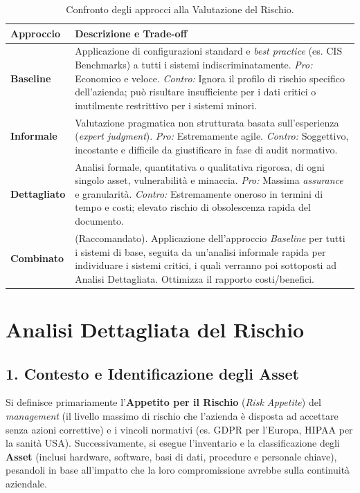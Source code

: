 \begin{table}[htbp]
\centering
\small
\begin{tabularx}{\textwidth}{@{}lX@{}}
\toprule
\textbf{Approccio} & \textbf{Descrizione e Trade-off} \\ \midrule
\textbf{Baseline} & Applicazione di configurazioni standard e \textit{best practice} (es. CIS Benchmarks) a tutti i sistemi indiscriminatamente. \textit{Pro:} Economico e veloce. \textit{Contro:} Ignora il profilo di rischio specifico dell'azienda; può risultare insufficiente per i dati critici o inutilmente restrittivo per i sistemi minori. \\ \addlinespace
\textbf{Informale} & Valutazione pragmatica non strutturata basata sull'esperienza (\textit{expert judgment}). \textit{Pro:} Estremamente agile. \textit{Contro:} Soggettivo, incostante e difficile da giustificare in fase di audit normativo. \\ \addlinespace
\textbf{Dettagliato} & Analisi formale, quantitativa o qualitativa rigorosa, di ogni singolo asset, vulnerabilità e minaccia. \textit{Pro:} Massima \textit{assurance} e granularità. \textit{Contro:} Estremamente oneroso in termini di tempo e costi; elevato rischio di obsolescenza rapida del documento. \\ \addlinespace
\textbf{Combinato} & (Raccomandato). Applicazione dell'approccio \textit{Baseline} per tutti i sistemi di base, seguita da un'analisi informale rapida per individuare i sistemi critici, i quali verranno poi sottoposti ad Analisi Dettagliata. Ottimizza il rapporto costi/benefici. \\ \bottomrule
\end{tabularx}
\caption{Confronto degli approcci alla Valutazione del Rischio.}
\label{tab:risk_approaches}
\end{table}

\section{Analisi Dettagliata del Rischio}

\subsection{1. Contesto e Identificazione degli Asset}
Si definisce primariamente l'\textbf{Appetito per il Rischio} (\textit{Risk Appetite}) del \textit{management} (il livello massimo di rischio che l'azienda è disposta ad accettare senza azioni correttive) e i vincoli normativi (es. GDPR per l'Europa, HIPAA per la sanità USA).
Successivamente, si esegue l'inventario e la classificazione degli \textbf{Asset} (inclusi hardware, software, basi di dati, procedure e personale chiave), pesandoli in base all'impatto che la loro compromissione avrebbe sulla continuità aziendale.

